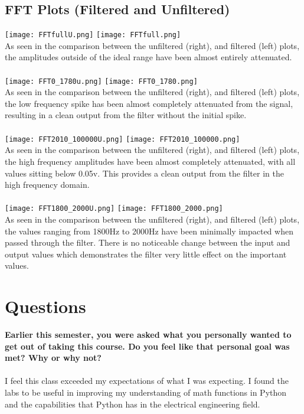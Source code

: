 \documentclass[12pt]{report}
\begin{document}
\subsection{FFT Plots (Filtered and Unfiltered)}
    \texttt{[image: FFTfullU.png]}
    \texttt{[image: FFTfull.png]}
    \\As seen in the comparison between the unfiltered (right), and filtered (left) plots, the amplitudes outside of the ideal range have been almost entirely attenuated. 
    \\ \\
    \texttt{[image: FFT0\_1780u.png]}
    \texttt{[image: FFT0\_1780.png]}
    \\As seen in the comparison between the unfiltered (right), and filtered (left) plots, the low frequency spike has been almost completely attenuated from the signal, resulting in a clean output from the filter without the initial spike. 
    \\ \\
    \texttt{[image: FFT2010\_100000U.png]}
    \texttt{[image: FFT2010\_100000.png]}
    \\As seen in the comparison between the unfiltered (right), and filtered (left) plots, the high frequency amplitudes have been almost completely attenuated, with all values sitting below 0.05v. This provides a clean output from the filter in the high frequency domain.
    \\ \\
    \texttt{[image: FFT1800\_2000U.png]}
    \texttt{[image: FFT1800\_2000.png]}
    \\As seen in the comparison between the unfiltered (right), and filtered (left) plots, the values ranging from 1800Hz to 2000Hz have been minimally impacted when passed through the filter. There is no noticeable change between the input and output values which demonstrates the filter very little effect on the important values.


\section{Questions}

\textbf{Earlier this semester, you were asked what you personally wanted to get out of taking this course. Do you feel like that personal goal was met? Why or why not?}
\\
\\I feel this class exceeded my expectations of what I was expecting. I found the labs to be useful in improving my understanding of math functions in Python and the capabilities that Python has in the electrical engineering field.
\end{document}
